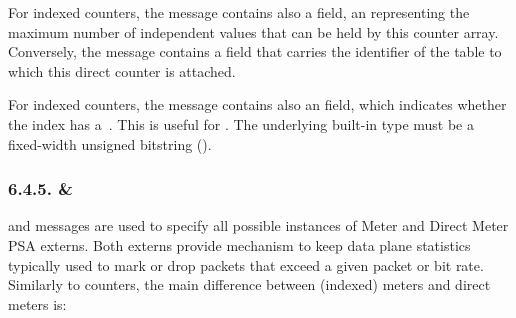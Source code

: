 \documentclass[11pt]{article}
\begin{document}
{%
\noindent{}For indexed counters, the  message contains also a  field, an
 representing the maximum number of independent values that can be held
by this counter array. Conversely, the  message contains a
 field that carries the  identifier of the table to
which this direct counter is attached.%

For indexed counters, the  message contains also an 
field, which indicates whether the index has a~. This is useful for
. The underlying built-in type must
be a fixed-width unsigned bitstring ().%

\subsubsection{6.4.5.\hspace*{0.5em} \& }\label{sec-meter-directmeter}%

\noindent{} and  messages are used to specify all possible instances of
Meter and Direct Meter PSA externs. Both externs provide mechanism to keep data
plane statistics typically used to mark or drop packets that exceed a given
packet or bit rate. Similarly to counters, the main difference between (indexed)
meters and direct meters is:%

}
\end{document}
